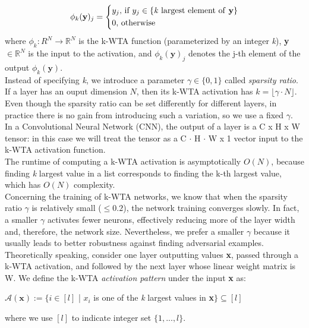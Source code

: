 \documentclass[a4paper]{article}
\begin{document}
	\begin{equation}
	\phi_{k}(\textbf{y})_{j} = 
	\begin{cases*}
	y_{j}\textrm{, if }y_{j} \in\{\textrm{\textit{k} largest element of \textbf{y}}\} \\
	0 \textrm{, otherwise}
	\end{cases*}
	\end{equation}
	where $\phi_{k}: \mathbb{}{R}^{N} \rightarrow \mathbb{R}^{N}$ is the k-WTA function (parameterized by an integer \textit{k}), \textbf{y} $\in \mathbb{R}^{N}$ is the input to the activation, and $\phi_{k}(\textbf{y})_{j}$ denotes the j-th element of the output $\phi_{k}(\textbf{y})$.\\
	Instead of specifying \textit{k}, we introduce a parameter $\gamma \in \{0,1\}$ called \emph{sparsity ratio}. If a layer has an ouput dimension $N$, then its k-WTA activation has  $k = \lfloor\gamma \cdot N\rfloor$. Even though the sparsity ratio can be set differently for different layers, in practice there is no gain from introducing such a variation, so we use a fixed $\gamma$.\\
	In a Convolutional Neural Network (CNN), the output of a layer is a C x H x W tensor: in this case we will treat the tensor as a C $\cdot$ H $\cdot$ W x 1 vector input to the k-WTA activation function.\\
	The runtime of computing a k-WTA activation is asymptotically $O(N)$, because finding \textit{k} largest value in a list corresponds to finding the k-th largest value, which has $O(N)$ complexity.\\
	Concerning the training of k-WTA networks, we know that when the sparsity ratio $\gamma$ is relatively small ($\le 0.2$), the network training converges slowly. In fact, a smaller $\gamma$ activates fewer neurons, effectively reducing more of the layer width and, therefore, the network size. Nevertheless, we prefer a smaller $\gamma$ because it usually leads to better robustness against finding adversarial examples.\\
	Theoretically speaking, consider one layer outputting values \textbf{x}, passed through  a k-WTA activation, and followed by the next layer whose linear weight matrix is
	W. We define the k-WTA \emph{activation pattern} under the input \textbf{x} as:
	\begin{center}
		$\mathcal{A}(\textbf{x}) := \{i \in [l]$ | $x_{i}$ is one of the \textit{k} largest values in \textbf{x}$\} \subseteq [l]$
	\end{center}
	where we use $[l]$ to indicate integer set $\{1,...,l\}$.\\
\end{document}
